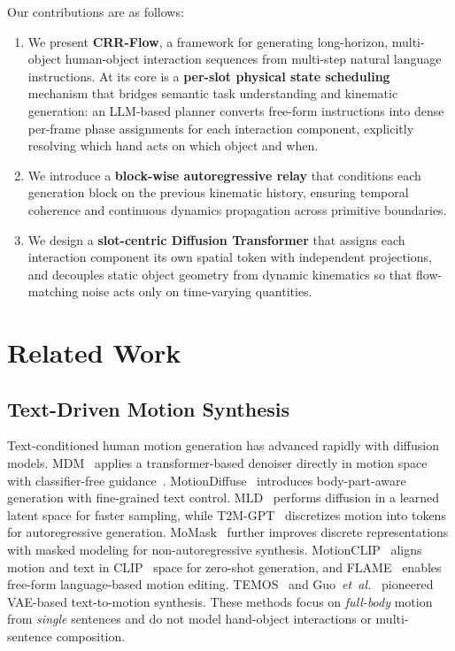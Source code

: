 \documentclass[sigconf, screen, review, anonymous]{acmart}
\newcommand{\etal}{\textit{et~al.}}
\begin{document}
Our contributions are as follows:
\begin{enumerate}
    \item We present \textbf{CRR-Flow}, a framework for generating long-horizon, multi-object human-object interaction sequences from multi-step natural language instructions.
    At its core is a \textbf{per-slot physical state scheduling} mechanism that bridges semantic task understanding and kinematic generation: an LLM-based planner converts free-form instructions
    into dense per-frame phase assignments for each interaction component, explicitly resolving which hand acts on which object and when.

    \item We introduce a \textbf{block-wise autoregressive relay}
    that conditions each generation block on the previous kinematic
    history, ensuring temporal coherence and
    continuous dynamics propagation across primitive boundaries.

    \item We design a \textbf{slot-centric Diffusion Transformer}
    that assigns each interaction component its own spatial token with independent projections, and decouples static object geometry from dynamic kinematics so that flow-matching noise acts only on time-varying quantities.
\end{enumerate}


\section{Related Work}
\label{sec:related}

\subsection{Text-Driven Motion Synthesis}
Text-conditioned human motion generation has advanced rapidly with diffusion models.
MDM~\cite{tevet2023human} applies a transformer-based denoiser directly in motion space with classifier-free guidance~\cite{ho2022classifier}.
MotionDiffuse~\cite{zhang2022motiondiffuse} introduces body-part-aware generation with fine-grained text control.
MLD~\cite{chen2023executing} performs diffusion in a learned latent space for faster sampling, while T2M-GPT~\cite{zhang2023t2mgpt} discretizes motion into tokens for autoregressive generation.
MoMask~\cite{guo2024momask} further improves discrete representations with masked modeling for non-autoregressive synthesis.
MotionCLIP~\cite{tevet2022motionclip} aligns motion and text in CLIP~\cite{radford2021learning} space for zero-shot generation, and FLAME~\cite{kim2023flame} enables free-form language-based motion editing.
TEMOS~\cite{petrovich2022temos} and Guo~\etal~\cite{guo2022generating} pioneered VAE-based text-to-motion synthesis.
These methods focus on \emph{full-body} motion from \emph{single} sentences and do not model hand-object interactions or multi-sentence composition.
\end{document}
